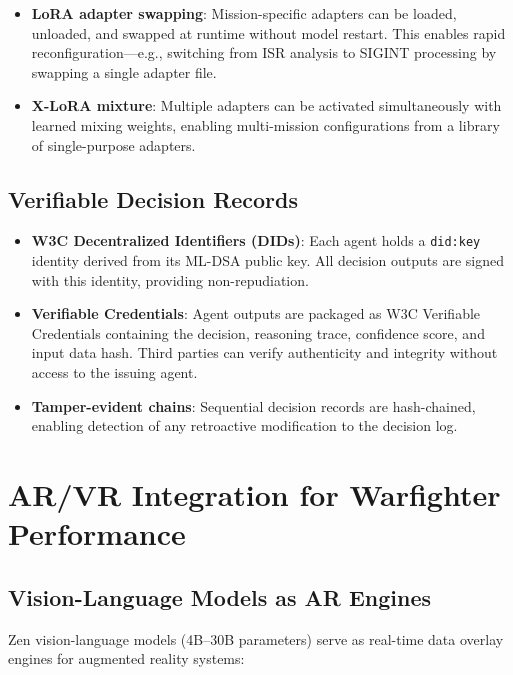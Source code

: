 \documentclass[11pt,letterpaper]{article}
\begin{document}
\begin{itemize}
\item \textbf{LoRA adapter swapping}: Mission-specific adapters can be loaded, unloaded, and swapped at runtime without model restart. This enables rapid reconfiguration---e.g., switching from ISR analysis to SIGINT processing by swapping a single adapter file.
\item \textbf{X-LoRA mixture}: Multiple adapters can be activated simultaneously with learned mixing weights, enabling multi-mission configurations from a library of single-purpose adapters.
\end{itemize}

\subsection{Verifiable Decision Records}

\begin{itemize}
\item \textbf{W3C Decentralized Identifiers (DIDs)}: Each agent holds a \texttt{did:key} identity derived from its ML-DSA public key. All decision outputs are signed with this identity, providing non-repudiation.
\item \textbf{Verifiable Credentials}: Agent outputs are packaged as W3C Verifiable Credentials containing the decision, reasoning trace, confidence score, and input data hash. Third parties can verify authenticity and integrity without access to the issuing agent.
\item \textbf{Tamper-evident chains}: Sequential decision records are hash-chained, enabling detection of any retroactive modification to the decision log.
\end{itemize}

\section{AR/VR Integration for Warfighter Performance}

\subsection{Vision-Language Models as AR Engines}

Zen vision-language models (4B--30B parameters) serve as real-time data overlay engines for augmented reality systems:
\end{document}
